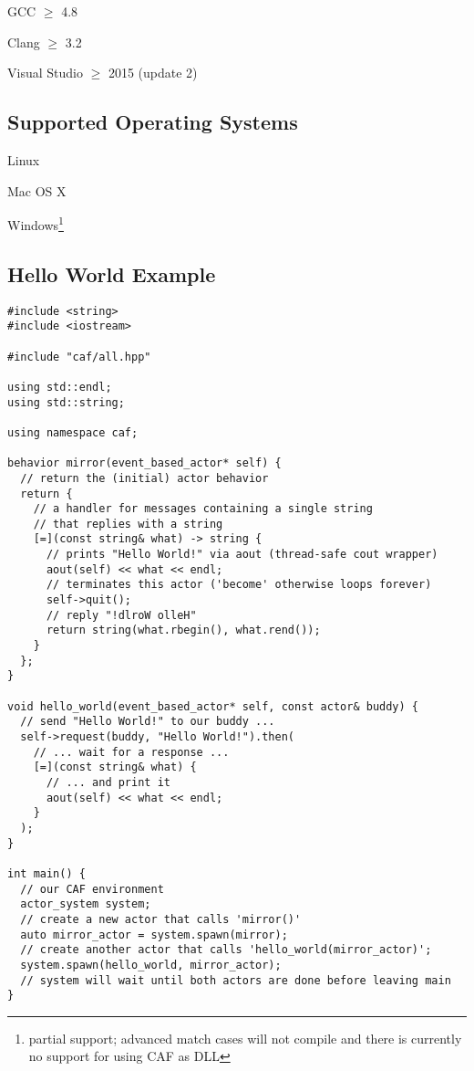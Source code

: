 \begin{itemize*}
  \item GCC $\ge$ 4.8
  \item Clang $\ge$ 3.2
  \item Visual Studio $\ge$ 2015 (update 2)
\end{itemize*}

\subsection{Supported Operating Systems}

\begin{itemize*}
\item Linux
\item Mac OS X
\item Windows\footnote{partial support; advanced match cases will not compile and there is currently no support for using CAF as DLL}
\end{itemize*}

\clearpage
\subsection{Hello World Example}

\begin{lstlisting}
#include <string>
#include <iostream>

#include "caf/all.hpp"

using std::endl;
using std::string;

using namespace caf;

behavior mirror(event_based_actor* self) {
  // return the (initial) actor behavior
  return {
    // a handler for messages containing a single string
    // that replies with a string
    [=](const string& what) -> string {
      // prints "Hello World!" via aout (thread-safe cout wrapper)
      aout(self) << what << endl;
      // terminates this actor ('become' otherwise loops forever)
      self->quit();
      // reply "!dlroW olleH"
      return string(what.rbegin(), what.rend());
    }
  };
}

void hello_world(event_based_actor* self, const actor& buddy) {
  // send "Hello World!" to our buddy ...
  self->request(buddy, "Hello World!").then(
    // ... wait for a response ...
    [=](const string& what) {
      // ... and print it
      aout(self) << what << endl;
    }
  );
}

int main() {
  // our CAF environment
  actor_system system;
  // create a new actor that calls 'mirror()'
  auto mirror_actor = system.spawn(mirror);
  // create another actor that calls 'hello_world(mirror_actor)';
  system.spawn(hello_world, mirror_actor);
  // system will wait until both actors are done before leaving main
}
\end{lstlisting}
